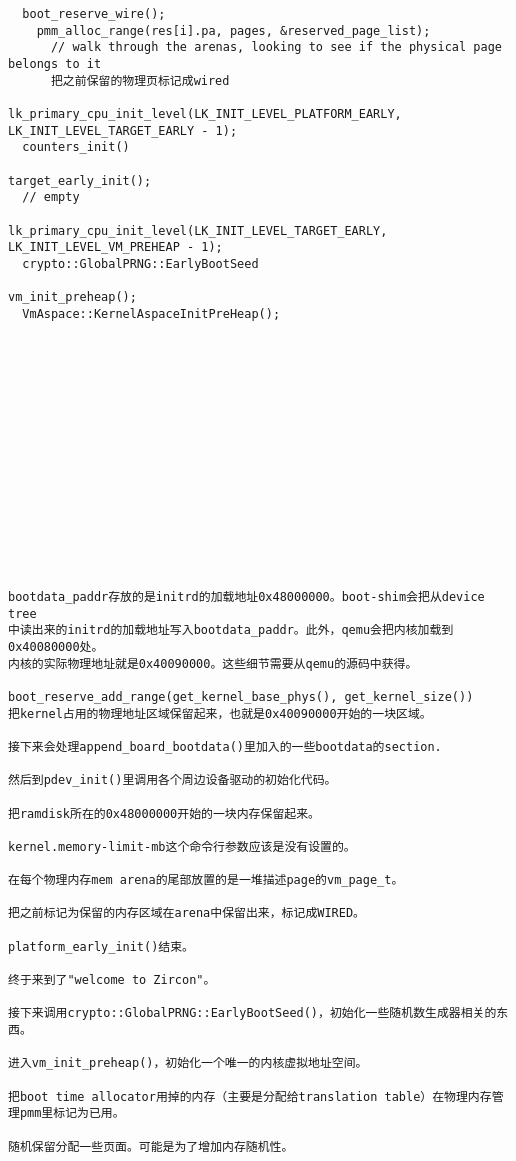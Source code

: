 \begin{verbatim}
  boot_reserve_wire();
    pmm_alloc_range(res[i].pa, pages, &reserved_page_list);
      // walk through the arenas, looking to see if the physical page belongs to it
      把之前保留的物理页标记成wired

lk_primary_cpu_init_level(LK_INIT_LEVEL_PLATFORM_EARLY, LK_INIT_LEVEL_TARGET_EARLY - 1);
  counters_init()

target_early_init();
  // empty

lk_primary_cpu_init_level(LK_INIT_LEVEL_TARGET_EARLY, LK_INIT_LEVEL_VM_PREHEAP - 1);
  crypto::GlobalPRNG::EarlyBootSeed

vm_init_preheap();
  VmAspace::KernelAspaceInitPreHeap();
















bootdata_paddr存放的是initrd的加载地址0x48000000。boot-shim会把从device tree
中读出来的initrd的加载地址写入bootdata_paddr。此外，qemu会把内核加载到0x40080000处。
内核的实际物理地址就是0x40090000。这些细节需要从qemu的源码中获得。

boot_reserve_add_range(get_kernel_base_phys(), get_kernel_size())
把kernel占用的物理地址区域保留起来，也就是0x40090000开始的一块区域。

接下来会处理append_board_bootdata()里加入的一些bootdata的section.

然后到pdev_init()里调用各个周边设备驱动的初始化代码。

把ramdisk所在的0x48000000开始的一块内存保留起来。

kernel.memory-limit-mb这个命令行参数应该是没有设置的。

在每个物理内存mem arena的尾部放置的是一堆描述page的vm_page_t。

把之前标记为保留的内存区域在arena中保留出来，标记成WIRED。

platform_early_init()结束。

终于来到了"welcome to Zircon"。

接下来调用crypto::GlobalPRNG::EarlyBootSeed()，初始化一些随机数生成器相关的东西。

进入vm_init_preheap()，初始化一个唯一的内核虚拟地址空间。

把boot time allocator用掉的内存（主要是分配给translation table）在物理内存管理pmm里标记为已用。

随机保留分配一些页面。可能是为了增加内存随机性。


\end{verbatim}
